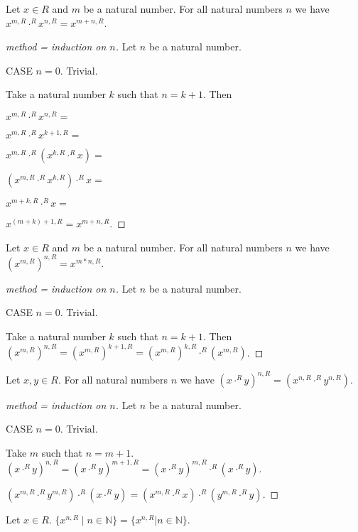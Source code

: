 \documentclass[11pt]{article}
\newcommand{\powers}[2]{\{{#1}^{n,#2} \mid n \in \mathbb{N}\}}
\begin{document}
\begin{forthel}
\begin{lemma} Let $x \in R$ and $m$ be a natural number.
For all natural numbers $n$
we have
$x^{m,R} \cdot^{R} x^{n,R} = x^{m + n,R}$.
\end{lemma}
\begin{proof}[method = induction on $n$]
Let $n$ be a natural number.

CASE $n = 0$. Trivial.

Take a natural number $k$ such that $n = k + 1$.
Then

$x^{m,R} \cdot^{R} x^{n,R} = $

$x^{m,R} \cdot^{R} x^{k+1,R} = $

$x^{m,R} \cdot^{R} (x^{k,R} \cdot^{R} x) = $

$(x^{m,R} \cdot^{R} x^{k,R}) \cdot^{R} x = $

$x^{m + k,R} \cdot^{R} x = $

$x^{(m + k)+1,R} = x^{m+n,R}.$
\end{proof}

\begin{lemma} Let $x \in R$ and $m$ be a natural number.
For all natural numbers $n$
we have
$(x^{m,R})^{n,R} = x^{m * n,R}$.
\end{lemma}
\begin{proof}[method = induction on $n$]
Let $n$ be a natural number.

CASE $n = 0$. Trivial.

Take a natural number $k$ such that $n = k + 1$. Then
$(x^{m,R})^{n,R} =
(x^{m,R})^{k+1,R} =
(x^{m,R})^{k,R} \cdot^{R} (x^{m,R})$.
\end{proof}

\begin{lemma} Let $x,y \in R$. For all natural numbers
$n$ we have
$(x \cdot^{R} y)^{n,R} = (x^{n,R} \cdot^{R} y^{n,R})$.
\end{lemma}
\begin{proof}[method = induction on $n$]
Let $n$ be a natural number.

CASE $n = 0$. Trivial.

Take $m$ such that $n = m + 1$.
$(x \cdot^{R} y)^{n,R} =
(x \cdot^{R} y)^{m+1,R} =
(x \cdot^{R} y)^{m,R} \cdot^{R} (x \cdot^{R} y).$

$(x^{m,R} \cdot^{R} y^{m,R}) \cdot^{R} (x \cdot^{R} y) =
(x^{m,R} \cdot^{R} x) \cdot^{R} ( y^{m,R} \cdot^{R} y)$.
\end{proof}

\begin{definition} Let $x \in R$. $\powers{x}{R} = \{x^{n,R} | n \in \mathbb{N} \} $.
\end{definition}


\end{forthel}
\end{document}
